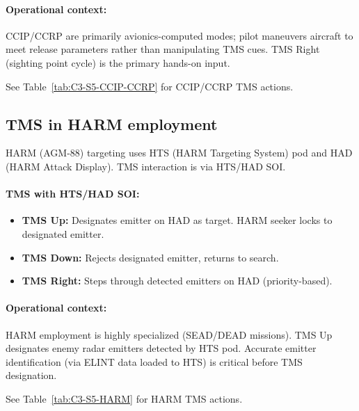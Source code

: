 \documentclass[11pt, a4paper, twoside]{report}
\begin{document}
\paragraph{Operational context:}
CCIP/CCRP are primarily avionics-computed modes; pilot maneuvers aircraft to meet release parameters rather than manipulating TMS cues. TMS Right (sighting point cycle) is the primary hands-on input.

See Table~\ref{tab:C3-S5-CCIP-CCRP} for CCIP/CCRP TMS actions.

\subsection{TMS in HARM employment}
\label{sec:C3-S5-S5}

HARM (AGM-88) targeting uses HTS (HARM Targeting System) pod and HAD (HARM Attack Display). TMS interaction is via HTS/HAD SOI.

\paragraph{TMS with HTS/HAD SOI:}
\begin{itemize}
    \item \textbf{TMS Up:} Designates emitter on HAD as target. HARM seeker locks to designated emitter.
    \item \textbf{TMS Down:} Rejects designated emitter, returns to search.
    \item \textbf{TMS Right:} Steps through detected emitters on HAD (priority-based).
\end{itemize}

\paragraph{Operational context:}
HARM employment is highly specialized (SEAD/DEAD missions). TMS Up designates enemy radar emitters detected by HTS pod. Accurate emitter identification (via ELINT data loaded to HTS) is critical before TMS designation.

See Table~\ref{tab:C3-S5-HARM} for HARM TMS actions.

\end{document}
